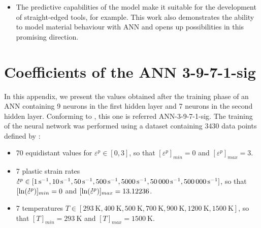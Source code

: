 \documentclass[preprint,12pt,times]{elsarticle}
\newcommand{\mdot}[1]{\accentset{\mbox{\bfseries .}}{#1}} %
\begin{document}
\begin{itemize}
  \item The predictive capabilities of the model make it suitable for the development of straight-edged tools, for example. This work also demonstrates the ability to model material behaviour with ANN and opens up possibilities in this promising direction.
\end{itemize}

%
%


%
%
%
%


%
%
%

\appendix
%
\section{Coefficients of the ANN 3-9-7-1-sig\label{sec:appendix-1}}

In this appendix, we present the values obtained after the training phase of an ANN containing 9 neurons in the first hidden layer and 7 neurons in the second hidden layer. Conforming to \cite{pantale_Efficient_2022}, this one is referred ANN-3-9-7-1-sig.
The training of the neural network was performed using a dataset containing \num{3430} data points defined by :
\begin{itemize}
\item \num{70} equidistant values for $\varepsilon^p\in[0,3]$, so that $[\varepsilon^p]_{min}=0$ and $[\varepsilon^p]_{max}=3$.
\item \num{7} plastic strain rates $\mdot{\varepsilon}^p\in[\qty{1}{\per\s}, \qty{10}{\per\s}, \qty{50}{\per\s}, \qty{500}{\per\s}, \qty{5000}{\per\s}, \qty{50000}{\per\s}, \qty{500000}{\per\s}]$, so that $[\ln(\mdot{\varepsilon}^p)]_{min}=0$ and $[\ln(\mdot{\varepsilon}^p)]_{max}=13.12236$.
\item \num{7} temperatures $T\in[\qty{293}{\K}, \qty{400}{\K}, \qty{500}{\K}, \qty{700}{\K}, \qty{900}{\K}, \qty{1200}{\K}, \qty{1500}{\K}]$, so that $[T]_{min}=\qty{293}{\K}$ and $[T]_{max}=\qty{1500}{\K}$.
\end{itemize}
\end{document}
